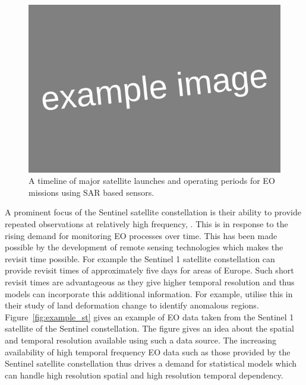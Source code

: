 \begin{figure}[htbp!] 
	\centering    
	\includegraphics[width=1.0\textwidth]{Example_image}
	\caption[Timeline of major EO satellites]{A timeline of major satellite launches and operating periods for EO missions using SAR based sensors.}
	\label{fig:sar_timeline}
\end{figure}

A prominent focus of the Sentinel satellite constellation is their ability to provide repeated observations at relatively high frequency, \cite{aschbacher_european_2012}.
This is in response to the rising demand for monitoring EO processes over time.
This has been made possible by the development of remote sensing technologies which makes the revisit time possible.
For example the Sentinel 1 satellite constellation can provide revisit times of approximately five days for areas of Europe. Such short revisit times are advantageous as they give higher temporal resolution and thus models can incorporate this additional information.
For example, \citeauthor{raspini_continuous_2018} utilise this in their study of land deformation change to identify anomalous regions.
Figure~\ref{fig:example_st} gives an example of EO data taken from the Sentinel 1 satellite of the Sentinel constellation.
The figure gives an idea about the spatial and temporal resolution available using such a data source.
The increasing availability of high temporal frequency EO data such as those provided by the Sentinel satellite constellation thus drives a demand for statistical models which can handle high resolution spatial and high resolution temporal  dependency.  

